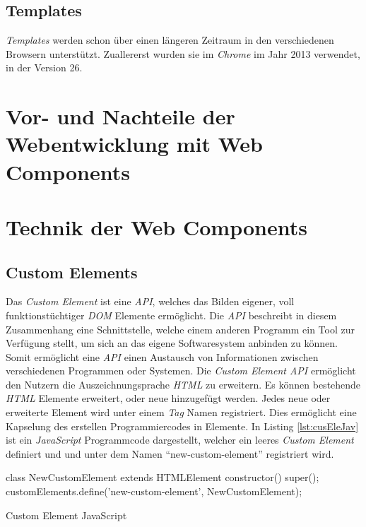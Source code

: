 \documentclass[12pt, paper=a4, bibtotoc, toc=listof]{scrreprt}
\begin{document}
		\subsection{Templates}
		\emph{Templates} werden schon über einen längeren Zeitraum in den verschiedenen Browsern unterstützt. Zuallererst wurden sie im \emph{Chrome} im Jahr 2013 verwendet, in der Version 26.
		\section{Vor- und Nachteile der Webentwicklung mit Web Components}
		\section{Technik der Web Components}
			\subsection{Custom Elements}
			Das \emph{Custom Element} ist eine \emph{\ac{API}}, welches das Bilden eigener, voll funktionstüchtiger \emph{\ac{DOM}} Elemente ermöglicht. Die \emph{\ac{API}} beschreibt in diesem Zusammenhang eine Schnittstelle, welche einem anderen Programm ein Tool zur Verfügung stellt, um sich an das eigene Softwaresystem anbinden zu können. Somit ermöglicht eine \emph{\ac{API}} einen Austausch von Informationen zwischen verschiedenen Programmen oder Systemen.	
			Die \emph{Custom Element \ac{API}} ermöglicht den Nutzern die Auszeichnungsprache \emph{\ac{HTML}} zu erweitern. Es können bestehende \emph{\ac{HTML}} Elemente erweitert, oder neue hinzugefügt werden. Jedes neue oder erweiterte Element wird unter einem \emph{Tag} Namen registriert. Dies ermöglicht eine Kapselung des erstellen Programmiercodes in Elemente. In Listing \ref{lst:cusEleJav} ist ein \emph{JavaScript} Programmcode dargestellt, welcher ein leeres \emph{Custom Element} definiert und und unter dem Namen \enquote{new-custom-element} registriert wird.
			\begin{listing}
				\begin{JavaScriptcode*}{}
class NewCustomElement extends HTMLElement {
	constructor() {
		super();
	}
}
customElements.define('new-custom-element', NewCustomElement);
				\end{JavaScriptcode*}
				\caption{Custom Element JavaScript}
				\label{lst:cusEleJav}
			\end{listing}
\end{document}

